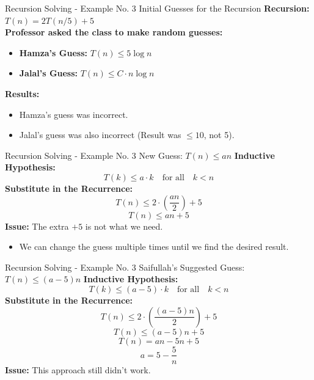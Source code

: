 \begin{frame}{Recursion Solving - Example No. 3}
    {Initial Guesses for the Recursion}
    \textbf{Recursion:} \( T(n) = 2T(n/5) + 5 \) \\
    \textbf{Professor asked the class to make random guesses:}
    \begin{itemize}
        \item \textbf{Hamza's Guess:} \( T(n) \leq 5 \log n \)
        \item \textbf{Jalal's Guess:} \( T(n) \leq C \cdot n \log n \)
    \end{itemize}
    \textbf{Results:}
    \begin{itemize}
        \item Hamza’s guess was incorrect.
        \item Jalal’s guess was also incorrect (Result was \( \leq 10 \), not 5).
    \end{itemize}
\end{frame}

\begin{frame}{Recursion Solving - Example No. 3}
    {New Guess: \( T(n) \leq an \)}
    \textbf{Inductive Hypothesis:} 
    \[
    T(k) \leq a \cdot k \quad \text{for all} \quad k < n
    \]
    \textbf{Substitute in the Recurrence:}
    \[
    T(n) \leq 2 \cdot \left( \frac{a n}{2} \right) + 5
    \]
    \[
    T(n) \leq an + 5
    \]
    \textbf{Issue:} The extra \( +5 \) is not what we need.
    \begin{itemize}
        \item We can change the guess multiple times until we find the desired result.
    \end{itemize}
\end{frame}

\begin{frame}{Recursion Solving - Example No. 3}
    {Saifullah's Suggested Guess: \( T(n) \leq (a - 5) n \)}
    \textbf{Inductive Hypothesis:} 
    \[
    T(k) \leq (a - 5) \cdot k \quad \text{for all} \quad k < n
    \]
    \textbf{Substitute in the Recurrence:}
    \[
    T(n) \leq 2 \cdot \left( \frac{(a - 5) n}{2} \right) + 5
    \]
    \[
    T(n) \leq (a - 5) n + 5
    \]
    \[
    T(n) = a n - 5n + 5
    \]
    \[
    a = 5 - \frac{5}{n}
    \]
    \textbf{Issue:} This approach still didn't work.
\end{frame}

